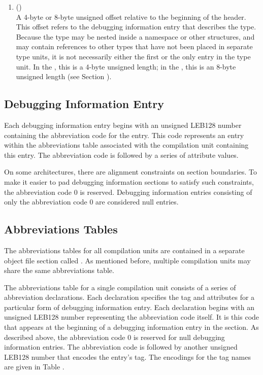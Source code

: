 \begin{enumerate}[1. ]
\item \HFNtypeoffset{} () \\
A 4-byte or 8-byte unsigned offset 
relative to the beginning
of the  header.
This offset refers to the debugging
information entry that describes the type. Because the type
may be nested inside a namespace or other structures, and may
contain references to other types that have not been placed in
separate type units, it is not necessarily either the first or
the only entry in the type unit. In the \thirtytwobitdwarfformat,
this is a 4-byte unsigned length; in the \sixtyfourbitdwarfformat,
this is an 8-byte unsigned length
(see Section ).

\end{enumerate}

\subsection{Debugging Information Entry}
\label{datarep:debugginginformationentry}
Each debugging information entry begins with an 
unsigned LEB128
number containing the abbreviation code for the entry. This
code represents an entry within the abbreviations table
associated with the compilation unit containing this entry. The
abbreviation code is followed by a series of attribute values.

On some architectures, there are alignment constraints on
section boundaries. To make it easier to pad debugging
information sections to satisfy such constraints, the
abbreviation code 0 is reserved. Debugging information entries
consisting of only the abbreviation code 0 are considered
null entries.

\subsection{Abbreviations Tables}
\label{datarep:abbreviationstables}
The abbreviations tables for all compilation units
are contained in a separate object file section called
\dotdebugabbrev{}.
As mentioned before, multiple compilation
units may share the same abbreviations table.

The abbreviations table for a single compilation unit consists
of a series of abbreviation declarations. Each declaration
specifies the tag and attributes for a particular form of
debugging information entry. Each declaration begins with
an unsigned LEB128
number representing the abbreviation
code itself. It is this code that appears at the beginning
of a debugging information entry in the 
\dotdebuginfo{}
section. As described above, the abbreviation
code 0 is reserved for null debugging information entries. The
abbreviation code is followed by another unsigned LEB128
number that encodes the entry\textquoteright s tag. The encodings for the
tag names are given in Table .

